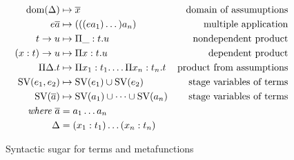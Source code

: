 \begin{figure}
\begin{align*}
\text{dom}(\Delta)        &\mapsto \overline{x}                           &\text{domain of assumuptions} \\
e \overline{a}      &\mapsto (((e a_1) \dots) a_n)                  &\text{multiple application} \\
t \to u             &\mapsto \Pi\_: t. u                            &\text{nondependent product} \\
(x: t) \to u        &\mapsto \Pi x: t. u                            &\text{dependent product} \\
\Pi\Delta.t         &\mapsto \Pi x_1: t_1. \dots \Pi x_n: t_n. t    &\text{product from assumptions} \\
\text{SV}(e_1, e_2)       &\mapsto \text{SV}(e_1) \cup \text{SV}(e_2)                 &\text{stage variables of terms} \\
\text{SV}(\overline{a})   &\mapsto \text{SV}(a_1) \cup \dots \cup \text{SV}(a_n)      &\text{stage variables of terms} \\
\textit{where}\ \overline{a} &= a_1 \dots a_n \\
\Delta  &= (x_1: t_1) \dots (x_n: t_n)
\end{align*}
\caption{Syntactic sugar for terms and metafunctions}
\label{fig:sugar}
\end{figure}